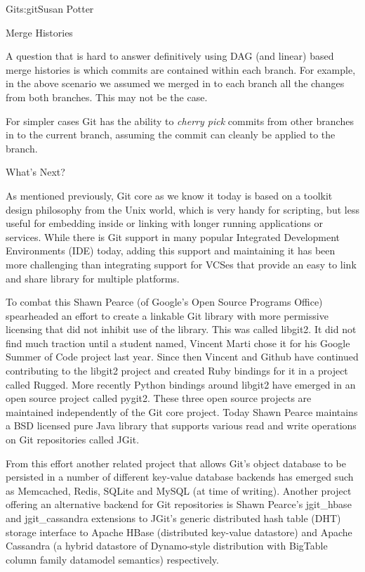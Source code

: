 \begin{aosachapter}{Git}{s:git}{Susan Potter}
\begin{aosasect1}{Merge Histories}

A question that is hard to answer definitively using DAG (and linear) based
merge histories is which commits are contained within each branch. For
example, in the above scenario we assumed we merged in to each branch all
the changes from both branches. This may not be the case.

For simpler cases Git has the ability to \emph{cherry pick} commits from
other branches in to the current branch, assuming the commit can cleanly
be applied to the branch.

\end{aosasect1}

\begin{aosasect1}{What's Next?}

As mentioned previously, Git core as we know it today is based on a toolkit
design philosophy from the Unix world, which is very handy for scripting,
but less useful for embedding inside or linking with longer running
applications or services. While there is Git support in many popular
Integrated Development Environments (IDE) today, adding this support and
maintaining it has been more challenging than integrating support for VCSes
that provide an easy to link and share library for multiple platforms.

To combat this Shawn Pearce (of Google's Open Source Programs Office)
spearheaded an effort to create a linkable Git library with more permissive
licensing that did not inhibit use of the library. This was called libgit2.
It did not find much traction until a student named, Vincent Marti chose it
for his Google Summer of Code project last year. Since then Vincent and
Github have continued contributing to the libgit2 project and created Ruby
bindings for it in a project called Rugged. More recently Python bindings
around libgit2 have emerged in an open source project called pygit2. These
three open source projects are maintained independently of the Git core
project. Today Shawn Pearce maintains a BSD licensed pure Java library that
supports various read and write operations on Git repositories called JGit.

From this effort another related project that allows Git's object database
to be persisted in a number of different key-value database backends has
emerged such as Memcached, Redis, SQLite and MySQL (at time of writing).
Another project offering an alternative backend for Git repositories is
Shawn Pearce's jgit\_hbase and jgit\_cassandra extensions to JGit's generic
distributed hash table (DHT) storage interface to Apache HBase (distributed
key-value datastore) and Apache Cassandra (a hybrid datastore of Dynamo-style
distribution with BigTable column family datamodel semantics) respectively.


\end{aosasect1}
\end{aosachapter}
